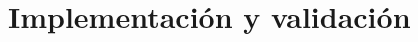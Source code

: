 \documentclass{beamer}
\begin{document}
\section{Implementación y validación}

\begin{frame}
  \sectionpage
\end{frame}

\end{document}
